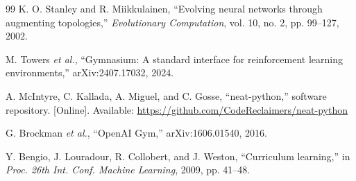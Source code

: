 \documentclass[journal]{IEEEtran}
\begin{document}
\begin{thebibliography}{99}
K. O. Stanley and R. Miikkulainen, ``Evolving neural networks through augmenting topologies,'' \emph{Evolutionary Computation}, vol. 10, no. 2, pp. 99--127, 2002.

M. Towers \emph{et al.}, ``Gymnasium: A standard interface for reinforcement learning environments,'' arXiv:2407.17032, 2024.

A. McIntyre, C. Kallada, A. Miguel, and C. Gosse, ``neat-python,'' software repository. [Online]. Available: \url{https://github.com/CodeReclaimers/neat-python}

G. Brockman \emph{et al.}, ``OpenAI Gym,'' arXiv:1606.01540, 2016.

Y. Bengio, J. Louradour, R. Collobert, and J. Weston, ``Curriculum learning,'' in \emph{Proc. 26th Int. Conf. Machine Learning}, 2009, pp. 41--48.
\end{thebibliography}
\end{document}

